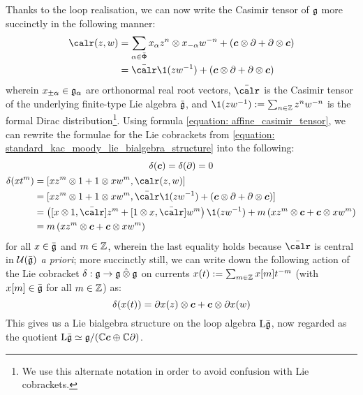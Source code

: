         Thanks to the loop realisation, we can now write the Casimir tensor of $\mathfrak{g}$ more succinctly in the following manner:
            \begin{equation} \label{equation: affine_casimir_tensor}
                \begin{aligned}
                    \calr(z, w) & = \sum_{\alpha \in \bar{\rootsystem}} x_{\alpha} z^n \tensor x_{-\alpha} w^{-n} + ( \level \tensor \del + \del \tensor \level )
                    \\
                    & = \bar{\calr} \1(zw^{-1}) + ( \level \tensor \del + \del \tensor \level )
                \end{aligned}
            \end{equation}
        wherein $x_{\pm \alpha} \in \mathfrak{g}_{\alpha}$ are orthonormal real root vectors, $\bar{\calr}$ is the Casimir tensor of the underlying finite-type Lie algebra $\bar{\mathfrak{g}}$, and $\1(zw^{-1}) := \sum_{n \in \Z} z^n w^{-n}$ is the formal Dirac distribution\footnote{We use this alternate notation in order to avoid confusion with Lie cobrackets.}. Using formula \eqref{equation: affine_casimir_tensor}, we can rewrite the formulae for the Lie cobrackets from \eqref{equation: standard_kac_moody_lie_bialgebra_structure} into the following:
            \begin{equation}
                \begin{gathered}
                    \delta(\level) = \delta(\del) = 0
                    \\
                    \begin{aligned}
                        \delta( x t^m ) & = [x z^m \tensor 1 + 1 \tensor x w^m, \calr(z, w)]
                        \\
                        & = [ x z^m \tensor 1 + 1 \tensor x w^m, \bar{\calr} \1(zw^{-1}) + ( \level \tensor \del + \del \tensor \level ) ]
                        \\
                        & = \left( [x \tensor 1, \bar{\calr}] z^m + [1 \tensor x, \bar{\calr}] w^m \right) \1(zw^{-1}) + m \left( x z^m \tensor \level + \level \tensor x w^m \right)
                        \\
                        & = m \left( x z^m \tensor \level + \level \tensor x w^m \right)
                    \end{aligned}
                \end{gathered}  
            \end{equation}
        for all $x \in \bar{\mathfrak{g}}$ and $m \in \mathbb{Z}$, wherein the last equality holds because $\bar{\calr}$ is central in $\mathcal{U}(\bar{\mathfrak{g}})$ \textit{a priori}; more succinctly still, we can write down the following action of the Lie cobracket $\delta: \g \to \g \hattensor \g$ on currents $x(t) := \sum_{m \in \mathbb{Z}} x[m] t^{-m}$ (with $x[m] \in \bar{\mathfrak{g}}$ for all $m \in \mathbb{Z}$) as:
            $$\delta( x(t) ) = \del x(z) \tensor \level + \level \tensor \del x(w)$$
        This gives us a Lie bialgebra structure on the loop algebra $\mathrm{L} \bar{\mathfrak{g}}$, now regarded as the quotient $\mathrm{L} \bar{\mathfrak{g}} \simeq \mathfrak{g}/(\mathbb{C} \boldsymbol{c} \oplus \mathbb{C} \partial)$. 